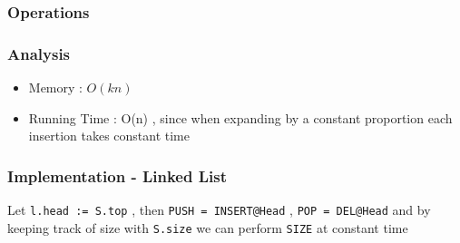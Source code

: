 		\subsubsection{Operations}

		\subsubsection{Analysis}
						\begin{itemize}
								\item[] Memory : $O(kn)$
								\item[] Running Time : O(n) , since when expanding by a constant proportion each insertion takes  constant time
						\end{itemize}

		\subsubsection{Implementation - Linked List}
				\par{Let \texttt{l.head := S.top} , then \texttt{PUSH = INSERT@Head} , \texttt{POP = DEL@Head} and by keeping track of size with \texttt{S.size} we can perform \texttt{SIZE} at constant time}


	
